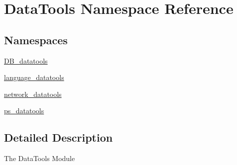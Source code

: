 \hypertarget{namespace_data_tools}{}\section{Data\+Tools Namespace Reference}
\label{namespace_data_tools}
\subsection*{Namespaces}
\begin{DoxyCompactItemize}
\item 
 \mbox{\hyperlink{namespace_data_tools_1_1_d_b__datatools}{D\+B\+\_\+datatools}}
\item 
 \mbox{\hyperlink{namespace_data_tools_1_1language__datatools}{language\+\_\+datatools}}
\item 
 \mbox{\hyperlink{namespace_data_tools_1_1network__datatools}{network\+\_\+datatools}}
\item 
 \mbox{\hyperlink{namespace_data_tools_1_1ps__datatools}{ps\+\_\+datatools}}
\end{DoxyCompactItemize}


\subsection{Detailed Description}
\begin{DoxyVerb}The DataTools Module
\end{DoxyVerb}
 